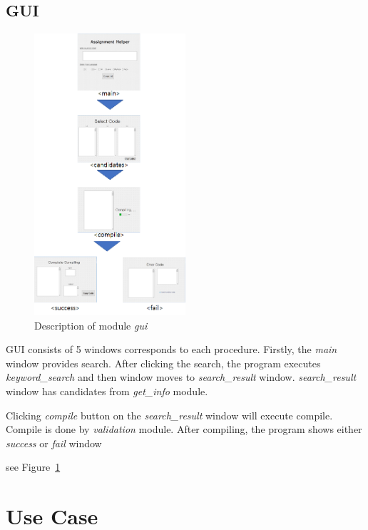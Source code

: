 \documentclass[conference]{IEEEtran}
\begin{document}
\subsection{GUI} %
\label{sub:gui}
\begin{figure}[ht]
\centering
\includegraphics[width=0.5\textwidth]{./figures/gui_overall.png}
\caption{Description of module \textit{gui}}
\label{gui}
\end{figure}
GUI consists of 5 windows corresponds to each procedure.
Firstly, the \textit{main} window provides search.
After clicking the search, the program executes \textit{keyword\_search} and then window moves to \textit{search\_result} window.
\textit{search\_result} window has candidates from \textit{get\_info} module.

Clicking \textit{compile} button on the  \textit{search\_result} window will execute compile.
Compile is done by \textit{validation} module. After compiling, the program shows either \textit{success} or \textit{fail} window


see Figure~\ref{gui}




\section{Use Case} %
\label{sec:use_case}
\end{document}
